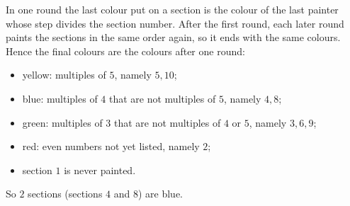 In one round the last colour put on a section is the colour of the last painter whose step divides the section number. After the first round, each later round paints the sections in the same order again, so it ends with the same colours. Hence the final colours are the colours after one round:
\begin{itemize}
\item yellow: multiples of $5$, namely $5,10$;
\item blue: multiples of $4$ that are not multiples of $5$, namely $4,8$;
\item green: multiples of $3$ that are not multiples of $4$ or $5$, namely $3,6,9$;
\item red: even numbers not yet listed, namely $2$;
\item section $1$ is never painted.
\end{itemize}
So $\boxed{2}$ sections (sections $4$ and $8$) are blue.

